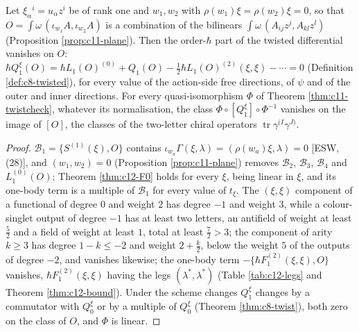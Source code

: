 \begin{proposition}
\label{prop:c12-twist}
Let $\xi_\alpha{}^i=u_\alpha z^i$ be of rank one and $w_1,w_2$ with $\rho(w_1)\xi=\rho(w_2)\xi=0$, so that $O=\int\omega\,(\iota_{w_1}A,\iota_{w_2}A)$ is a combination of the bilinears $\int\omega\,(A_{ij}z^j,A_{kl}z^l)$ (Proposition \ref{prop:c11-plane}). Then the order-$\hbar$ part of the twisted differential vanishes on $O$: $\hbar Q^\xi_1(O)=\hbar L_1(O)^{(0)}+Q_1(O)-\tfrac12\hbar L_1(O)^{(2)}(\xi,\xi)-\cdots=0$ (Definition \ref{def:c8-twisted}), for every value of the action-side free directions, of $\psi$ and of the outer and inner directions. For every quasi-isomorphism $\Phi$ of Theorem \ref{thm:c11-twistcheck}, whatever its normalisation, the class $\Phi\circ[Q^\xi_1]\circ\Phi^{-1}$ vanishes on the image of $[O]$, the classes of the two-letter chiral operators $\operatorname{tr}\gamma^{(I}\gamma^{J)}$.
\end{proposition}

\begin{proof}
$\mathcal B_1=\{S^{(1)}(\xi),O\}$ contains $\iota_{w_a}\Gamma(\xi,\lambda)=(\rho(w_a)\xi,\lambda)=0$ [ESW, (28)], and $(w_1,w_2)=0$ (Proposition \ref{prop:c11-plane}) removes $\mathcal B_2$, $\mathcal B_3$, $\mathcal B_4$ and $L_1^{(0)}(O)$; Theorem \ref{thm:c12-F0} holds for every $\xi$, being linear in $\xi$, and its one-body term is a multiple of $\mathcal B_1$ for every value of $t_\xi$. The $(\xi,\xi)$ component of a functional of degree $0$ and weight $2$ has degree $-1$ and weight $3$, while a colour-singlet output of degree $-1$ has at least two letters, an antifield of weight at least $\tfrac52$ and a field of weight at least $1$, total at least $\tfrac72>3$; the component of arity $k\ge3$ has degree $1-k\le-2$ and weight $2+\tfrac k2$, below the weight $5$ of the outputs of degree $-2$, and vanishes likewise; the one-body term $-\{\hbar F_1^{(2)}(\xi,\xi),O\}$ vanishes, $\hbar F_1^{(2)}(\xi,\xi)$ having the legs $(\lambda^*,\lambda^*)$ (Table \ref{tab:c12-legs} and Theorem \ref{thm:c12-bound}). Under the scheme changes $Q^\xi_1$ changes by a commutator with $Q^\xi_0$ or by a multiple of $Q^\xi_0$ (Theorem \ref{thm:c8-twist}), both zero on the class of $O$, and $\Phi$ is linear.
\end{proof}

